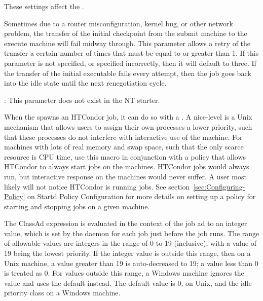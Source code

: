 These settings affect the .
\begin{description}

\label{param:ExecTransferAttempts}
\item[\Macro{EXEC\_TRANSFER\_ATTEMPTS}]
  Sometimes due to a router misconfiguration, kernel bug, or other
  network problem, the transfer of the initial checkpoint from
  the submit machine to the execute machine will fail midway through.
  This parameter allows a retry of the transfer a certain number of times
  that must be equal to or greater than 1. If this parameter is not
  specified, or specified incorrectly, then it will default to three.
  If the transfer of the initial executable fails every attempt, then
  the job goes back into the idle state until the next renegotiation
  cycle.

  \Note: This parameter does not exist in the NT starter.

\label{param:JobReniceIncrement}
\item[\Macro{JOB\_RENICE\_INCREMENT}]
  When the  spawns an HTCondor job, it can do so with a
  .
  A nice-level is a
  Unix mechanism that allows users to assign their own processes a lower 
  priority, such that these processes do not interfere with interactive
  use of the machine.
  For machines with lots
  of real memory and swap space, such that the only scarce resource is CPU time,
  use this macro in conjunction with a policy that
  allows HTCondor to always start jobs on the machines. 
  HTCondor jobs would always run,
  but interactive response on the machines would never suffer.
  A user most likely will not notice HTCondor is
  running jobs.  See section~\ref{sec:Configuring-Policy} on
  Startd Policy Configuration for more details on setting up a
  policy for starting and stopping jobs on a given machine.

  The ClassAd expression is evaluated in the context of the job ad
  to an integer value, which is
  set by the  daemon for each job just before the
  job runs.
  The range of allowable values are integers in the range of 0 to 19
  (inclusive),
  with a value of 19 being the lowest priority.  
  If the integer value is outside this range,
  then on a Unix machine, a value greater than 19 is auto-decreased to 19;
  a value less than 0 is treated as 0.
  For values outside this range, a Windows machine ignores the value
  and uses the default instead.
  The default value is 0, on Unix, and the idle priority class on
  a Windows machine.


\end{description}
